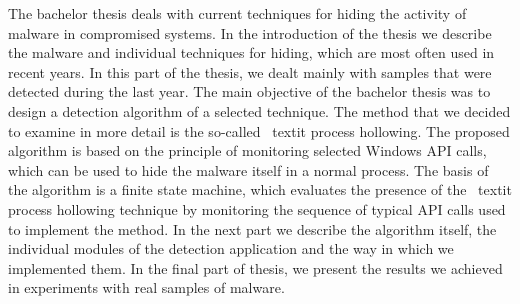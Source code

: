 The bachelor thesis deals with current techniques for hiding the activity of malware in compromised systems. In the introduction of the thesis we describe the malware and individual techniques for hiding, which are most often used in recent years. In this part of the thesis, we dealt mainly with samples that were detected during the last year. The main objective of the bachelor thesis was to design a detection algorithm of a selected technique. The method that we decided to examine in more detail is the so-called \ textit {process hollowing}. The proposed algorithm is based on the principle of monitoring selected Windows API calls, which can be used to hide the malware itself in a normal process. The basis of the algorithm is a finite state machine, which evaluates the presence of the \ textit {process hollowing} technique by monitoring the sequence of typical API calls used to implement the method. In the next part we describe the algorithm itself, the individual modules of the detection application and the way in which we implemented them. In the final part of thesis, we present the results we achieved in experiments with real samples of malware.
